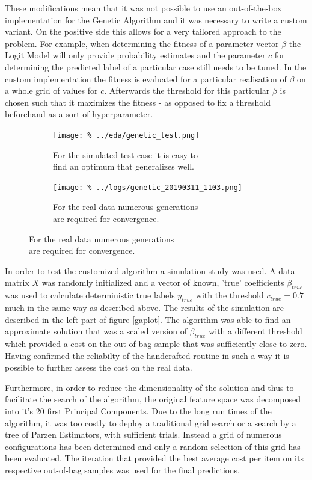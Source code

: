 These modifications mean that it was not possible to use an out-of-the-box implementation for the Genetic Algorithm and it was necessary to write a custom variant. On the positive side this allows for a very tailored approach to the problem. For example, when determining the fitness of a parameter vector $\beta$ the Logit Model will only provide probability estimates and the parameter $c$ for determining the predicted label of a particular case still needs to be tuned. In the custom implementation the fitness is evaluated for a particular realisation of $\beta$ on a whole grid of values for $c$. Afterwards the threshold for this particular $\beta$ is chosen such that it maximizes the fitness - as opposed to fix a threshold beforehand as a sort of hyperparameter.

\begin{figure}
\centering
\caption{Results of the Genetic Algorithm}\label{gaplot}
\begin{subfigure}[b]{0.5\textwidth}            
            \texttt{[image: \%
            ../eda/genetic\_test.png]}
            \caption{For the simulated test case it is easy                 to \\find an optimum that generalizes well.}
    \end{subfigure}%
    \begin{subfigure}[b]{0.5\textwidth}
            \centering
            \texttt{[image: \%
            ../logs/genetic\_20190311\_1103.png]}
            \caption{For the real data numerous generations \\are required for convergence.}
    \end{subfigure}
\end{figure}

In order to test the customized algorithm a simulation study was used. A data matrix $X$ was randomly initialized and a vector of known, 'true' coefficients $\beta_{true}$ was used to calculate deterministic true labels $y_{true}$ with the threshold $c_{true} = 0.7$ much in the same way as described above. The results of the simulation are described in the left part of figure \ref{gaplot}. The algorithm was able to find an approximate solution that was a scaled version of $\beta_{true}$ with a different threshold which provided a cost on the out-of-bag sample that was sufficiently close to zero. Having confirmed the reliabilty of the handcrafted routine in such a way it is possible to further assess the cost on the real data.

Furthermore, in order to reduce the dimensionality of the solution and thus to facilitate the search of the algorithm, the original feature space was decomposed into it's 20 first Principal Components. Due to the long run times of the algorithm, it was too costly to deploy a traditional grid search or a search by a tree of Parzen Estimators, with sufficient trials. Instead a grid of numerous configurations has been determined and only a random selection of this grid has been evaluated. The iteration that provided the best average cost per item on its respective out-of-bag samples was used for the final predictions.

